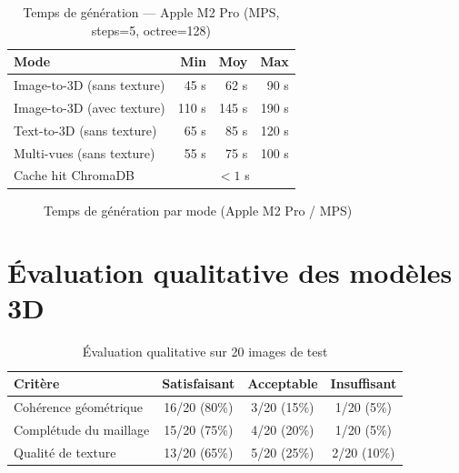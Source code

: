\documentclass[12pt,a4paper,oneside]{report}
\newcommand{\theadrow}{\rowcolor{tekupblue!12}}
\begin{document}
\begin{table}[H]
\centering
\caption{Temps de génération --- Apple M2 Pro (MPS, steps=5, octree=128)}
\label{tab:perf}
\begin{tabular}{@{}lrrr@{}}
\toprule
\theadrow
\textbf{Mode} & \textbf{Min} & \textbf{Moy} & \textbf{Max} \\\midrule
Image-to-3D (sans texture) & 45 s  & 62 s  & 90 s  \\
Image-to-3D (avec texture) & 110 s & 145 s & 190 s \\
Text-to-3D (sans texture)  & 65 s  & 85 s  & 120 s \\
Multi-vues (sans texture)  & 55 s  & 75 s  & 100 s \\
Cache hit ChromaDB         & \multicolumn{3}{c}{$< 1$ s} \\
\bottomrule
\end{tabular}
\end{table}

\begin{figure}[H]
\centering
{}
\caption{Temps de génération par mode (Apple M2 Pro / MPS)}
\label{fig:perf}
\end{figure}

\section{Évaluation qualitative des modèles 3D}

\begin{table}[H]
\centering
\caption{Évaluation qualitative sur 20 images de test}
\label{tab:qual}
\begin{tabular}{@{}lccc@{}}
\toprule
\theadrow
\textbf{Critère} & \textbf{Satisfaisant} & \textbf{Acceptable} & \textbf{Insuffisant} \\\midrule
Cohérence géométrique & 16/20 (80\%) & 3/20 (15\%) & 1/20 (5\%) \\
Complétude du maillage & 15/20 (75\%) & 4/20 (20\%) & 1/20 (5\%) \\
Qualité de texture    & 13/20 (65\%) & 5/20 (25\%) & 2/20 (10\%) \\
\bottomrule
\end{tabular}
\end{table}
\end{document}
